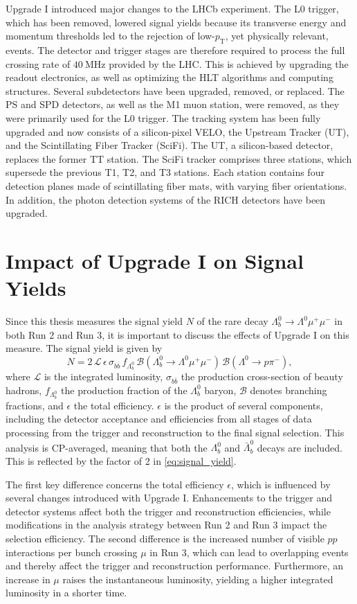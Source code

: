 Upgrade I introduced major changes to the LHCb experiment. The L0 trigger, which has been removed, lowered signal yields because its transverse energy and momentum thresholds led to the rejection of low-$p_{\text{T}}$, yet physically relevant, events.
The detector and trigger stages are therefore required to process the full crossing rate of $\qty{40}{\mega\hertz}$ provided by the LHC. This is achieved by upgrading the readout electronics, as well as optimizing the HLT algorithms and computing structures. Several subdetectors have been upgraded, removed, or replaced. The PS and SPD detectors, as well as the M1 muon station, were removed, as they were primarily used for the L0 trigger. The tracking system has been fully upgraded and now consists of a silicon-pixel VELO, the Upstream Tracker (UT), and the Scintillating Fiber Tracker (SciFi). The UT, a silicon-based detector, replaces the former TT station. The SciFi tracker comprises three stations, which supersede the previous T1, T2, and T3 stations. Each station contains four detection planes made of scintillating fiber mats, with varying fiber orientations. In addition, the photon detection systems of the RICH detectors have been upgraded.

\section{Impact of Upgrade I on Signal Yields}
\label{sec:lhcb_upgrade_effects}
Since this thesis measures the signal yield $N$ of the rare decay $\Lambda_b^0 \to \Lambda^0 \mu^+ \mu^-$ in both Run 2 and Run 3, it is important to discuss the effects of Upgrade I on this measure. The signal yield is given by
\begin{equation}
    N = 2 \, \mathcal{L} \, \epsilon \, \sigma_{b\bar{b}} \, f_{\Lambda_b^0} \, \mathcal{B}(\Lambda_b^0 \to \Lambda^0 \mu^+ \mu^-) \, \mathcal{B}(\Lambda^0 \to p \pi^-),
    \label{eq:signal_yield}
\end{equation}
where $\mathcal{L}$ is the integrated luminosity, $\sigma_{b\bar{b}}$ the production cross-section of beauty hadrons, $f_{\Lambda_b^0}$ the production fraction of the $\Lambda_b^0$ baryon, $\mathcal{B}$ denotes branching fractions, and $\epsilon$ the total efficiency. $\epsilon$ is the product of several components, including the detector acceptance and efficiencies from all stages of data processing from the trigger and reconstruction to the final signal selection. This analysis is CP-averaged, meaning that both the $\Lambda_b^0$ and $\bar{\Lambda}_b^0$ decays are included. This is reflected by the factor of 2 in \cref{eq:signal_yield}.

The first key difference concerns the total efficiency $\epsilon$, which is influenced by several changes introduced with Upgrade I. Enhancements to the trigger and detector systems affect both the trigger and reconstruction efficiencies, while modifications in the analysis strategy between Run 2 and Run 3 impact the selection efficiency. The second difference is the increased number of visible $pp$ interactions per bunch crossing $\mu$ in Run 3, which can lead to overlapping events and thereby affect the trigger and reconstruction performance. Furthermore, an increase in $\mu$ raises the instantaneous luminosity, yielding a higher integrated luminosity in a shorter time. 